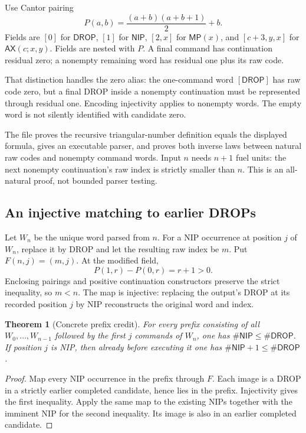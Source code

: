 \documentclass[11pt]{article}
\newtheorem{theorem}{Theorem}[section]
\newcommand{\DROP}{\mathsf{DROP}}
\newcommand{\NIP}{\mathsf{NIP}}
\newcommand{\MP}{\mathsf{MP}}
\newcommand{\AX}{\mathsf{AX}}
\begin{document}
Use Cantor pairing
\[
 P(a,b)=\frac{(a+b)(a+b+1)}2+b.
\]
Fields are $[0]$ for $\DROP$, $[1]$ for $\NIP$, $[2,x]$ for $\MP(x)$, and
$[c+3,y,x]$ for $\AX(c;x,y)$. Fields are nested with $P$. A final command has
continuation residual zero; a nonempty remaining word has residual one plus
its raw code.

That distinction handles the zero alias: the one-command word $[\DROP]$ has
raw code zero, but a final DROP inside a nonempty continuation must be represented
through residual one. Encoding injectivity applies to nonempty words. The
empty word is not silently identified with candidate zero.

The file proves the recursive triangular-number definition equals the displayed
formula, gives an executable parser, and proves both inverse laws between
natural raw codes and nonempty command words. Input $n$ needs $n+1$ fuel units:
the next nonempty continuation's raw index is strictly smaller than $n$.
This is an all-natural proof, not bounded parser testing.

\subsection{An injective matching to earlier DROPs}

Let $W_n$ be the unique word parsed from $n$. For a NIP occurrence at position
$j$ of $W_n$, replace it by DROP and let the resulting raw index be $m$. Put
$F(n,j)=(m,j)$. At the modified field,
\[
 P(1,r)-P(0,r)=r+1>0.
\]
Enclosing pairings and positive continuation constructors preserve the strict
inequality, so $m<n$. The map is injective: replacing the output's DROP at its
recorded position $j$ by NIP reconstructs the original word and index.

\begin{theorem}[Concrete prefix credit]
For every prefix consisting of all $W_0,\ldots,W_{n-1}$ followed by the first
$j$ commands of $W_n$, one has $\#\NIP\leq\#\DROP$. If position $j$ is NIP,
then already before executing it one has $\#\NIP+1\leq\#\DROP$.
\end{theorem}
\begin{proof}
Map every NIP occurrence in the prefix through $F$. Each image is a DROP in
a strictly earlier completed candidate, hence lies in the prefix. Injectivity
gives the first inequality. Apply the same map to the existing NIPs together
with the imminent NIP for the second inequality. Its image is also in an
earlier completed candidate.
\end{proof}
\end{document}
